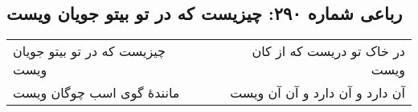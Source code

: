 \begin{center}
\section*{رباعی شماره ۲۹۰: چیزیست که در تو بیتو جویان ویست}
\label{sec:0290}
\begin{longtable}{l p{0.5cm} r}
چیزیست که در تو بیتو جویان ویست
&&
در خاک تو دریست که از کان ویست
\\
مانندهٔ گوی اسب چوگان ویست
&&
آن دارد و آن دارد و آن آن ویست
\\
\end{longtable}
\end{center}
